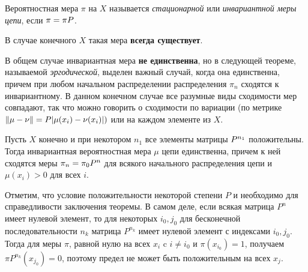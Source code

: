 \begin{definition}
    Вероятностная мера $\pi$ на $X$ называется \textit{стационарной} или \textit{инвариантной меры цепи}, если $\pi = \pi\P$.
\end{definition}


В случае конечного $X$ такая мера \textbf{всегда существует}. 

В общем случае инвариантная мера \textbf{не единственна}, но в следующей теореме, называемой \textit{эргодической}, выделен важный случай, когда она единственна, причем при любом начальном распределении распределения $\pi_n$ сходятся к инвариантному. В данном конечном случае все разумные виды сходимости
мер совпадают, так что можно говорить о сходимости по вариации (по
метрике $\|\mu - \nu\| =
\P|\mu(x_i) - \nu(x_i)|)$ или на каждом элементе из $X$.

\begin{theorem}
    Пусть $X$ конечно и при некотором $n_1$ все элементы матрицы $\P^{n_1}$ положительны. Тогда инвариантная вероятностная мера $\mu$ цепи единственна, причем к ней сходятся меры $\pi_n = \pi_0\P^n$ для всякого начального распределения цепи и $\mu(x_i) > 0$ для всех $i$.
\end{theorem}

\begin{note}
    Отметим, что условие положительности некоторой степени $P$ и необходимо для справедливости заключения теоремы. В самом деле, если всякая матрица $P^n$ имеет нулевой элемент, то для некоторых $i_0, j_0$ для бесконечной последовательности $n_k$ матрица $P^{n_k}$ имеет нулевой элемент с индексами $i_0, j_0$. Тогда для меры $\pi$, равной нулю на всех $x_i$ c $i \neq i_0$ и $\pi(x_{i_0}) = 1$, получаем $\pi P^{n_k} (x_{j_0}) = 0$, поэтому предел не может быть положительным на всех $x_j$.
\end{note}